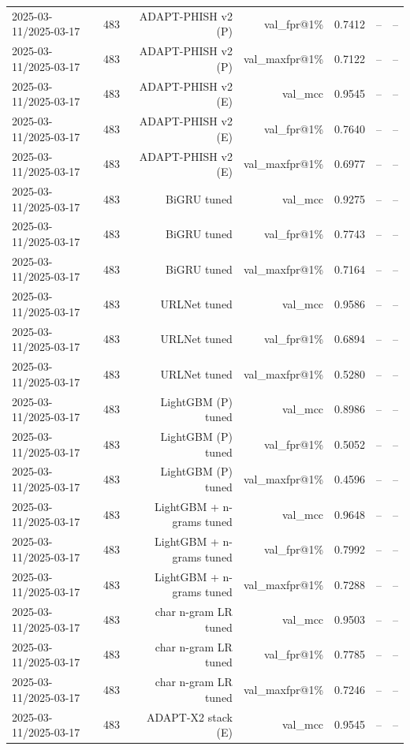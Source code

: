 \begin{table}[t]
\begin{tabular}{llrrrrr}
2025-03-11/2025-03-17 & 483 & ADAPT-PHISH v2 (P) & val\_fpr@1\% & 0.7412 & -- & -- \\
2025-03-11/2025-03-17 & 483 & ADAPT-PHISH v2 (P) & val\_maxfpr@1\% & 0.7122 & -- & -- \\
2025-03-11/2025-03-17 & 483 & ADAPT-PHISH v2 (E) & val\_mcc & 0.9545 & -- & -- \\
2025-03-11/2025-03-17 & 483 & ADAPT-PHISH v2 (E) & val\_fpr@1\% & 0.7640 & -- & -- \\
2025-03-11/2025-03-17 & 483 & ADAPT-PHISH v2 (E) & val\_maxfpr@1\% & 0.6977 & -- & -- \\
2025-03-11/2025-03-17 & 483 & BiGRU tuned & val\_mcc & 0.9275 & -- & -- \\
2025-03-11/2025-03-17 & 483 & BiGRU tuned & val\_fpr@1\% & 0.7743 & -- & -- \\
2025-03-11/2025-03-17 & 483 & BiGRU tuned & val\_maxfpr@1\% & 0.7164 & -- & -- \\
2025-03-11/2025-03-17 & 483 & URLNet tuned & val\_mcc & 0.9586 & -- & -- \\
2025-03-11/2025-03-17 & 483 & URLNet tuned & val\_fpr@1\% & 0.6894 & -- & -- \\
2025-03-11/2025-03-17 & 483 & URLNet tuned & val\_maxfpr@1\% & 0.5280 & -- & -- \\
2025-03-11/2025-03-17 & 483 & LightGBM (P) tuned & val\_mcc & 0.8986 & -- & -- \\
2025-03-11/2025-03-17 & 483 & LightGBM (P) tuned & val\_fpr@1\% & 0.5052 & -- & -- \\
2025-03-11/2025-03-17 & 483 & LightGBM (P) tuned & val\_maxfpr@1\% & 0.4596 & -- & -- \\
2025-03-11/2025-03-17 & 483 & LightGBM + n-grams tuned & val\_mcc & 0.9648 & -- & -- \\
2025-03-11/2025-03-17 & 483 & LightGBM + n-grams tuned & val\_fpr@1\% & 0.7992 & -- & -- \\
2025-03-11/2025-03-17 & 483 & LightGBM + n-grams tuned & val\_maxfpr@1\% & 0.7288 & -- & -- \\
2025-03-11/2025-03-17 & 483 & char n-gram LR tuned & val\_mcc & 0.9503 & -- & -- \\
2025-03-11/2025-03-17 & 483 & char n-gram LR tuned & val\_fpr@1\% & 0.7785 & -- & -- \\
2025-03-11/2025-03-17 & 483 & char n-gram LR tuned & val\_maxfpr@1\% & 0.7246 & -- & -- \\
2025-03-11/2025-03-17 & 483 & ADAPT-X2 stack (E) & val\_mcc & 0.9545 & -- & -- \\

\end{tabular}
\end{table}
